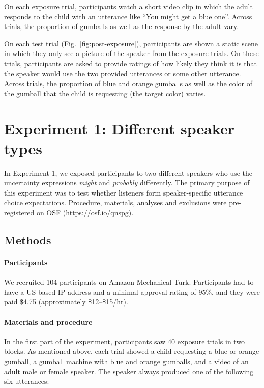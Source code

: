 \documentclass[10pt,letterpaper]{article}
\begin{document}
On each exposure trial, participants watch a short video clip in which the adult responds to the child with an utterance like ``You might get a blue one''. Across trials, the proportion
of gumballs as well as the response by the adult vary. 

On each test trial (Fig.~\ref{fig:post-exposure}), participants are shown a static scene in which they only see a picture of the speaker from the exposure trials. On these trials,
participants are asked to provide ratings of how likely they think it is that the speaker would use the two provided utterances or some other utterance.
Across trials, the proportion of blue and orange gumballs as well as the color of the gumball that the child is requesting (the target color) varies.

\section{Experiment 1: Different speaker types}

In Experiment 1, we exposed participants to two different speakers who 
use the uncertainty expressions \textit{might} and \textit{probably} differently. 
The primary purpose of this experiment was to test whether listeners  
form speaker-specific  utterance choice expectations.
Procedure, materials, analyses and exclusions
were pre-registered on OSF (https://osf.io/qnspg).

\subsection{Methods}

\paragraph{Participants}
 We recruited 104 participants on Amazon Mechanical Turk. 
Participants had to have a US-based IP address and a minimal approval rating of 
95\%, and they were paid \$4.75 (approximately \$12--\$15/hr). 

\paragraph{Materials and procedure}

 In the first part of the experiment, participants saw 40 exposure trials in two blocks. As mentioned above, each trial showed a child requesting a blue or orange gumball, a gumball machine with blue and orange gumballs, and a video of an adult male or female speaker. The speaker always produced one of the following six utterances:%
 
\end{document}
